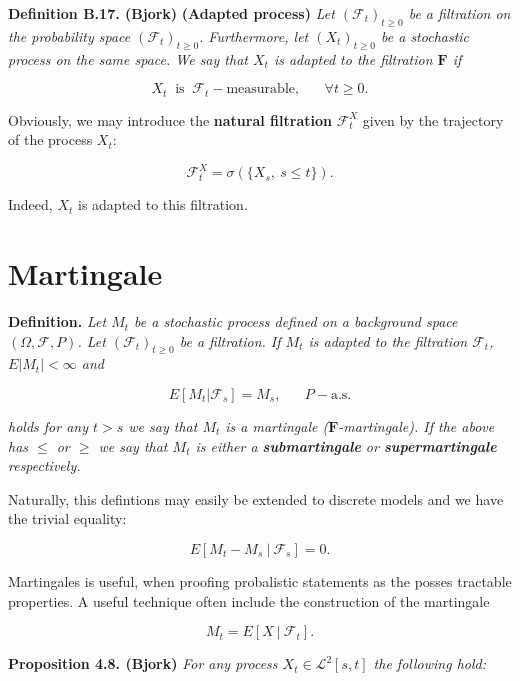 \documentclass[a4paper,12pt,openany]{book}
\begin{document}
\textbf{Definition B.17. (Bjork)} \textbf{(Adapted process)} \emph{Let \((\mathcal{F}_t)_{t\ge 0}\) be a filtration on the probability space \((\mathcal{F}_t)_{t\ge 0}\). Furthermore, let \((X_t)_{t\ge 0}\) be a stochastic process on the same space. We say that \(X_t\) is adapted to the filtration \(\mathbf{F}\) if}

\[
X_t\ \text{ is }\ \mathcal{F}_t-\text{measurable},\hspace{20pt}\forall t\ge 0.
\]

Obviously, we may introduce the \textbf{natural filtration} \(\mathcal{F}^X_t\) given by the trajectory of the process \(X_t\):

\[
\mathcal{F}^X_t=\sigma(\{X_s,\ s\le t\}).
\]

Indeed, \(X_t\) is adapted to this filtration.

\hypertarget{martingale}{%
\section{Martingale}\label{martingale}}

\textbf{Definition.} \emph{Let \(M_t\) be a stochastic process defined on a background space \((\Omega,\mathcal{F},P)\). Let \((\mathcal{F}_t)_{t\ge 0}\) be a filtration. If \(M_t\) is adapted to the filtration \(\mathcal{F}_t\), \(E\vert M_t\vert <\infty\) and}

\[
E[M_t\vert \mathcal{F}_s]=M_s,\hspace{20pt}P-\text{a.s.}
\]

\emph{holds for any \(t>s\) we say that \(M_t\) is a martingale (\(\mathbf{F}\)-martingale). If the above has \(\le\) or \(\ge\) we say that \(M_t\) is either a \textbf{submartingale} or \textbf{supermartingale} respectively.}

Naturally, this defintions may easily be extended to discrete models and we have the trivial equality:

\[
E[M_t-M_s\ \vert\ \mathcal{F}_s]=0.
\]

Martingales is useful, when proofing probalistic statements as the posses tractable properties. A useful technique often include the construction of the martingale

\[
M_t=E[X\ \vert\ \mathcal{F}_t].
\]

\textbf{Proposition 4.8. (Bjork)} \emph{For any process \(X_t\in\mathcal{L}^2[s,t]\) the following hold:}
\end{document}

